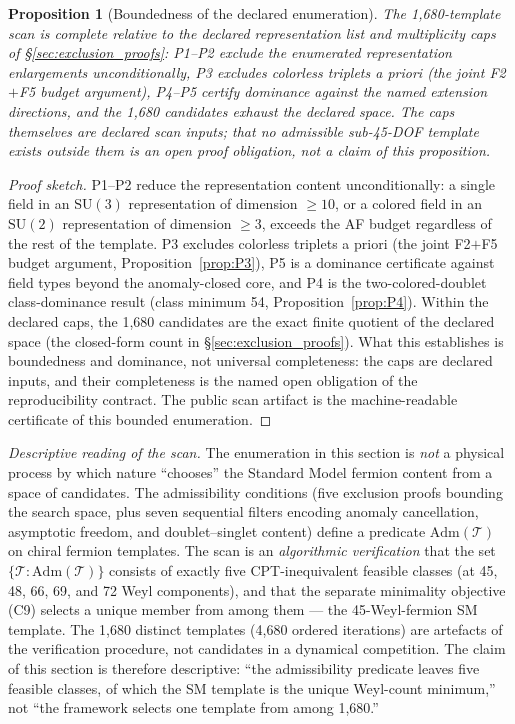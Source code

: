 \documentclass[11pt]{article}
\newtheorem{proposition}[theorem]{Proposition}
\theoremstyle{definition}
\newcommand{\SU}{\mathrm{SU}}
\begin{document}
\begin{proposition}[Boundedness of the declared enumeration]
\label{prop:scan_completeness_v35}
The 1{,}680-template scan is complete relative to the declared
representation list and multiplicity caps of
\S\ref{sec:exclusion_proofs}: P1--P2 exclude the enumerated
representation enlargements unconditionally, P3 excludes colorless
triplets a priori (the joint F2$+$F5 budget argument), P4--P5 certify
dominance against the named extension directions, and the 1{,}680
candidates exhaust the declared space.  The caps themselves are declared scan
inputs; that no admissible sub-45-DOF template exists outside them is
an open proof obligation, not a claim of this proposition.
\end{proposition}

\begin{proof}[Proof sketch]
P1--P2 reduce the representation content unconditionally: a single
field in an $\SU(3)$ representation of dimension $\ge 10$, or a
colored field in an $\SU(2)$ representation of dimension $\ge 3$,
exceeds the AF budget regardless of the rest of the template.  P3 excludes
colorless triplets a priori (the joint F2$+$F5 budget argument,
Proposition~\ref{prop:P3}), P5 is a dominance certificate against
field types beyond the anomaly-closed core, and P4 is the
two-colored-doublet class-dominance result (class minimum 54,
Proposition~\ref{prop:P4}).  Within the declared
caps, the 1{,}680 candidates are the exact finite quotient of the
declared space (the closed-form count in
\S\ref{sec:exclusion_proofs}).  What this establishes is boundedness
and dominance, not universal completeness: the caps are declared
inputs, and their completeness is the named open obligation of the
reproducibility contract.  The public scan artifact is the
machine-readable certificate of this bounded enumeration.
\end{proof}

\smallskip\noindent\textit{Descriptive reading of the scan.}\quad
The enumeration in this section is \emph{not} a physical process by
which nature ``chooses'' the Standard Model fermion content from a
space of candidates.  The admissibility conditions (five exclusion
proofs bounding the search space, plus seven sequential filters
encoding anomaly cancellation, asymptotic freedom, and
doublet--singlet content)
define a predicate
$\mathrm{Adm}(\mathcal{T})$ on chiral fermion templates.  The scan
is an \emph{algorithmic verification} that the set
$\{\mathcal{T} : \mathrm{Adm}(\mathcal{T})\}$ consists of exactly
five CPT-inequivalent feasible classes (at 45, 48, 66, 69, and 72
Weyl components), and that the separate minimality objective (C9)
selects a unique member from among them --- the 45-Weyl-fermion SM
template.  The 1{,}680 distinct templates (4{,}680 ordered
iterations) are artefacts of the verification procedure, not
candidates in a dynamical competition.  The claim of this section is
therefore descriptive: ``the admissibility predicate leaves five
feasible classes, of which the SM template is the unique
Weyl-count minimum,'' not ``the framework selects one template
from among 1{,}680.''
\end{document}
